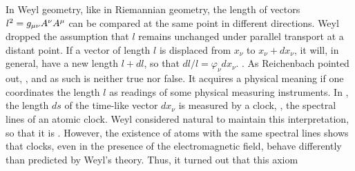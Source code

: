 \documentclass[draft]{article}
\newcommand{\phin}{\ensuremath{\varphi_\nu}\xspace}
\newcommand{\WT}{Weyl's theory\xspace}
\newcommand{\WG}{Weyl geometry\xspace}
\begin{document}
\begin{W}
\item\label{W1} In \WG, like in Riemannian geometry, the length of vectors  $l^2=g_{\mu\nu} A^\nu A^\mu$ can be compared at the same point in different directions. Weyl dropped the assumption that $l$ remains unchanged under parallel transport at a distant point. If a vector of length $l$ is displaced from $x_\nu$ to $x_\nu+dx_\nu$, it will, in general, have a new length $l+dl$, so that $dl/l=\phin dx_\nu$. . As Reichenbach pointed out,  \citep[366]{Reichenbach1922a}, and as such is neither true nor false. It acquires a physical meaning if one coordinates the length $l$ as readings of some physical measuring instruments. In \gr, the length $ds$ of the time-like vector $dx_\nu$ is measured by a clock, \eg, the spectral lines of an atomic clock. Weyl considered natural to maintain this interpretation, so that it is  \citep[366]{Reichenbach1922a}. However, the existence of atoms with the same spectral lines shows that clocks, even in the presence of the electromagnetic field, behave differently than predicted by \WT. Thus, it turned out that this axiom   \citep[366]{Reichenbach1922a}


\end{W}
\end{document}

